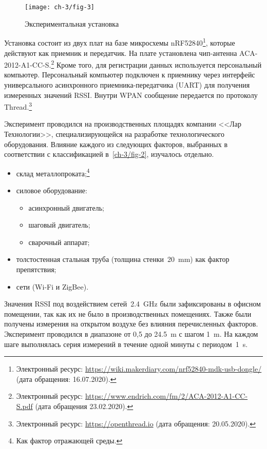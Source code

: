 \begin{figure} [ht]
	\centering
	\texttt{[image: ch-3/fig-3]}
	\caption{Экспериментальная установка}
	\label{ch-3/fig-3}
\end{figure}

Установка состоит из двух плат на базе микросхемы nRF52840\footnote{Электронный ресурс: {\url{https://wiki.makerdiary.com/nrf52840-mdk-usb-dongle/}} (дата обращения: 16.07.2020).}, которые действуют как приемник и передатчик. На плате установлена чип-антенна ACA-2012-A1-CC-S.\footnote{Электронный ресурс: \url{https://www.endrich.com/fm/2/ACA-2012-A1-CC-S.pdf} (дата обращения 23.02.2020).}
Кроме того, для регистрации данных используется персональный компьютер. Персональный компьютер подключен к приемнику через интерфейс универсального асинхронного приемника-передатчика (UART) для получения измеренных значений RSSI. Внутри WPAN сообщение передается по протоколу Thread.\footnote{Электронный ресурс: {\url{https://openthread.io}} (дата обращения: 20.05.2020).}

Эксперимент проводился на производственных площадях компании <<Лар Технологии>>, специализирующейся на разработке технологического оборудования. Влияние каждого из следующих факторов, выбранных в соответствии с классификацией в~\cref{ch-3/fig-2}, изучалось отдельно.

\begin{itemize}
\item склад металлопроката;\footnote{Как фактор отражающей среды.}
\item силовое оборудование:
	\begin{itemize}
		\item асинхронный двигатель;
		\item шаговый двигатель;
		\item сварочный аппарат;
	\end{itemize}
\item толстостенная стальная труба (толщина стенки~\SI{20}{\milli\meter}) как фактор препятствия;
\item сети (Wi-Fi и ZigBee).
\end{itemize}

Значения RSSI под воздействием сетей~\SI{2,4}{\giga\hertz} были зафиксированы в офисном помещении, так как их не было в производственных помещениях. Также были получены измерения на открытом воздухе без влияния перечисленных факторов. Эксперимент проводился в диапазоне от 0,5 до \SI{24,5}{\meter} с шагом \SI{1}{\meter}. На каждом шаге выполнялась серия измерений в течение одной минуты с периодом~\SI{1}{\second}.

